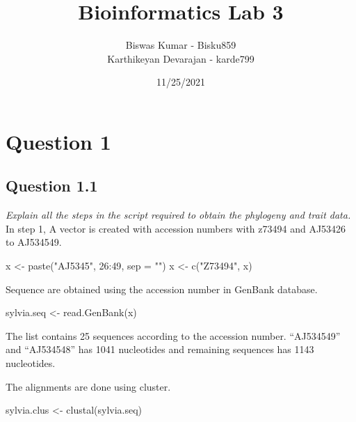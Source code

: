 \documentclass[
]{article}
\title{Bioinformatics Lab 3}
\author{Biswas Kumar - Bisku859\\
Karthikeyan Devarajan - karde799}
\date{11/25/2021}
\newenvironment{Shaded}{\begin{snugshade}}{\end{snugshade}}
\newcommand{\AttributeTok}[1]{\textcolor[rgb]{0.77,0.63,0.00}{#1}}
\newcommand{\DecValTok}[1]{\textcolor[rgb]{0.00,0.00,0.81}{#1}}
\newcommand{\FunctionTok}[1]{\textcolor[rgb]{0.00,0.00,0.00}{#1}}
\newcommand{\NormalTok}[1]{#1}
\newcommand{\OtherTok}[1]{\textcolor[rgb]{0.56,0.35,0.01}{#1}}
\newcommand{\SpecialCharTok}[1]{\textcolor[rgb]{0.00,0.00,0.00}{#1}}
\newcommand{\StringTok}[1]{\textcolor[rgb]{0.31,0.60,0.02}{#1}}
\begin{document}
\maketitle

\hypertarget{question-1}{%
\section{Question 1}\label{question-1}}

\hypertarget{question-1.1}{%
\subsection{Question 1.1}\label{question-1.1}}

\emph{Explain all the steps in the script required to obtain the
phylogeny and trait data.}\\
In step 1, A vector is created with accession numbers with z73494 and
AJ53426 to AJ534549.

\begin{Shaded}
\begin{Highlighting}[]
\NormalTok{x }\OtherTok{\textless{}{-}} \FunctionTok{paste}\NormalTok{(}\StringTok{"AJ5345"}\NormalTok{, }\DecValTok{26}\SpecialCharTok{:}\DecValTok{49}\NormalTok{, }\AttributeTok{sep =} \StringTok{""}\NormalTok{)}
\NormalTok{x }\OtherTok{\textless{}{-}} \FunctionTok{c}\NormalTok{(}\StringTok{"Z73494"}\NormalTok{, x)}
\end{Highlighting}
\end{Shaded}

Sequence are obtained using the accession number in GenBank database.

\begin{Shaded}
\begin{Highlighting}[]
\NormalTok{sylvia.seq }\OtherTok{\textless{}{-}} \FunctionTok{read.GenBank}\NormalTok{(x)}
\end{Highlighting}
\end{Shaded}

The list contains 25 sequences according to the accession number.
``AJ534549'' and ``AJ534548'' has 1041 nucleotides and remaining
sequences has 1143 nucleotides.

The alignments are done using cluster.

\begin{Shaded}
\begin{Highlighting}[]
\NormalTok{sylvia.clus }\OtherTok{\textless{}{-}} \FunctionTok{clustal}\NormalTok{(sylvia.seq)}
\end{Highlighting}
\end{Shaded}
\end{document}
